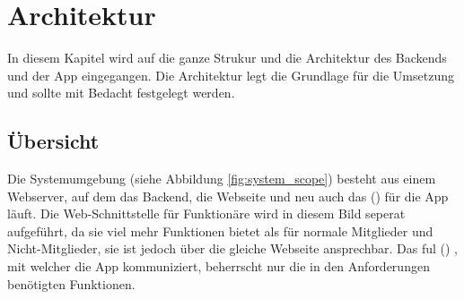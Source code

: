 %
%

\chapter{Architektur}\label{chap.architektur}
In diesem Kapitel wird auf die ganze Strukur und die Architektur des Backends und der App eingegangen. Die Architektur legt die Grundlage für die Umsetzung und sollte mit Bedacht festgelegt werden.

\section{Übersicht}\label{architektur_uebersicht}
Die Systemumgebung (siehe Abbildung \ref{fig:system_scope}) besteht aus einem Webserver, auf dem das Backend, die Webseite und neu auch das  () für die App läuft. Die Web-Schnittstelle für Funktionäre wird in diesem Bild seperat aufgeführt, da sie viel mehr Funktionen bietet als für normale Mitglieder und Nicht-Mitglieder, sie ist jedoch über die gleiche Webseite ansprechbar. Das  ful () , mit welcher die App kommuniziert, beherrscht nur die in den Anforderungen benötigten Funktionen.
